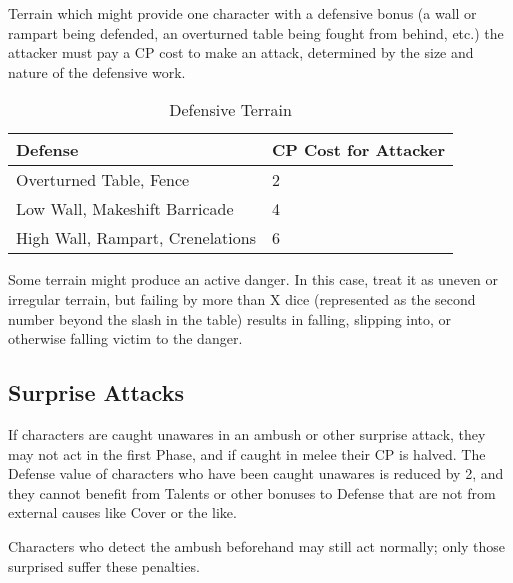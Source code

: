 \documentclass[oneside,11pt,english]{book}
\begin{document}
Terrain which might provide one character with a defensive bonus (a wall or rampart being defended, an
overturned table being fought from behind, etc.) the attacker must pay a CP cost to make an attack,
determined by the size and nature of the defensive work.
\begin{table}[ht]
  \caption{Defensive Terrain}
  \label{tab:Defensive Terrain}
  \begin{tabu} spread 0pt {X[-1]X[-1]}
    Defense & CP Cost for Attacker\\ \toprule
    Overturned Table, Fence&2\\
    Low Wall, Makeshift Barricade&4\\
    High Wall, Rampart, Crenelations&6\\
  \end{tabu}
\end{table}

Some terrain might produce an active danger. In this case, treat it as uneven or irregular terrain, but failing by more than X dice (represented as the second number beyond the slash in the table) results in falling, slipping into, or otherwise falling victim to the danger.

\subsection{Surprise Attacks}
If characters are caught unawares in an ambush or other surprise attack, they may not act in the first Phase, and if caught in melee their CP is halved. The Defense value of characters who have been caught unawares is reduced by 2, and they cannot benefit from Talents or other bonuses to Defense that are not from external causes like Cover or the like. 

Characters who detect the ambush beforehand may still act normally; only those surprised suffer these penalties.
\end{document}
